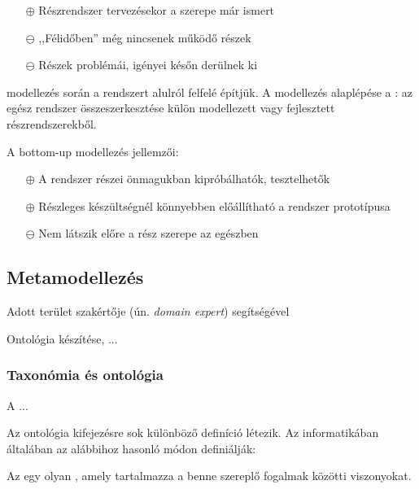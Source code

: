 \begin{itemize}
	\item[$\oplus$] Részrendszer tervezésekor a szerepe már ismert
	\item[$\ominus$] ,,Félidőben'' még nincsenek működő részek
	\item[$\ominus$] Részek problémái, igényei későn derülnek ki
\end{itemize}

\begin{definicio}
	 modellezés során a rendszert alulról felfelé építjük. A modellezés alaplépése a : az egész rendszer összeszerkesztése külön modellezett vagy fejlesztett részrendszerekből.
\end{definicio}

A bottom-up modellezés jellemzői:

\begin{itemize}
	\item[$\oplus$] A rendszer részei önmagukban kipróbálhatók, tesztelhetők
	\item[$\oplus$] Részleges készültségnél könnyebben előállítható a rendszer prototípusa
	\item[$\ominus$] Nem látszik előre a rész szerepe az egészben
\end{itemize}


\subsection{Metamodellezés}

Adott terület szakértője (ún. \emph{domain expert}) segítségével 

Ontológia készítése, ...



\subsubsection{Taxonómia és ontológia}

\begin{definicio}
	A  ...
\end{definicio}

Az ontológia kifejezésre sok különböző definíció létezik. Az informatikában általában az alábbihoz hasonló módon definiálják:

\begin{definicio}
	Az  egy olyan , amely tartalmazza a benne szereplő fogalmak közötti viszonyokat. 
\end{definicio}

